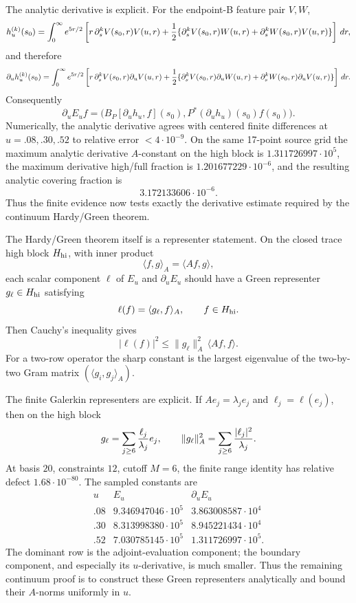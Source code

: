 \documentclass[11pt]{article}
\begin{document}
The analytic derivative is explicit.  For the endpoint-B feature pair \(V,W\),
\[
h_u^{(k)}(s_0)=\int_0^\infty e^{5r/2}
\left[
r\,\partial_s^kV(s_0,r)V(u,r)
+{1\over2}\{\partial_s^kV(s_0,r)W(u,r)
+\partial_s^kW(s_0,r)V(u,r)\}
\right]\,dr,
\]
and therefore
\[
\partial_u h_u^{(k)}(s_0)=\int_0^\infty e^{5r/2}
\left[
r\,\partial_s^kV(s_0,r)\partial_uV(u,r)
+{1\over2}\{\partial_s^kV(s_0,r)\partial_uW(u,r)
+\partial_s^kW(s_0,r)\partial_uV(u,r)\}
\right]\,dr.
\]
Consequently
\[
  \partial_u E_u f
  =
  \bigl(B_P[\partial_u h_u,f](s_0),
        P^\ast(\partial_u h_u)(s_0)f(s_0)\bigr).
\]
Numerically, the analytic derivative agrees with centered finite differences
at \(u=.08,.30,.52\) to relative error \(<4\cdot10^{-9}\).  On the same
17-point source grid the maximum analytic derivative \(A\)-constant on the
high block is \(1.311726997\cdot10^5\), the maximum derivative high/full
fraction is \(1.201677229\cdot10^{-6}\), and the resulting analytic covering
fraction is
\[
  3.172133606\cdot10^{-6}.
\]
Thus the finite evidence now tests exactly the derivative estimate required by
the continuum Hardy/Green theorem.

The Hardy/Green theorem itself is a representer statement.  On the closed
trace high block \(H_{\rm hi}\), with inner product
\[
  \langle f,g\rangle_A=\langle Af,g\rangle,
\]
each scalar component \(\ell\) of \(E_u\) and \(\partial_uE_u\) should have a
Green representer \(g_\ell\in H_{\rm hi}\) satisfying
\[
  \ell(f)=\langle g_\ell,f\rangle_A,\qquad f\in H_{\rm hi}.
\]
Then Cauchy's inequality gives
\[
  |\ell(f)|^2\le \|g_\ell\|_A^2\,\langle Af,f\rangle.
\]
For a two-row operator the sharp constant is the largest eigenvalue of the
two-by-two Gram matrix \((\langle g_i,g_j\rangle_A)\).

The finite Galerkin representers are explicit.  If \(Ae_j=\lambda_j e_j\) and
\(\ell_j=\ell(e_j)\), then on the high block
\[
  g_\ell=\sum_{j\ge6}{\ell_j\over\lambda_j}e_j,\qquad
  \|g_\ell\|_A^2=\sum_{j\ge6}{|\ell_j|^2\over\lambda_j}.
\]
At basis \(20\), constraints \(12\), cutoff \(M=6\), the finite range identity
has relative defect \(1.68\cdot10^{-80}\).  The sampled constants are
\[
\begin{array}{c|c|c}
u & E_u & \partial_uE_u\\\hline
.08 & 9.346947046\cdot10^5 & 3.863008587\cdot10^4\\
.30 & 8.313998380\cdot10^5 & 8.945221434\cdot10^4\\
.52 & 7.030785145\cdot10^5 & 1.311726997\cdot10^5 .
\end{array}
\]
The dominant row is the adjoint-evaluation component; the boundary component,
and especially its \(u\)-derivative, is much smaller.  Thus the remaining
continuum proof is to construct these Green representers analytically and
bound their \(A\)-norms uniformly in \(u\).
\end{document}
